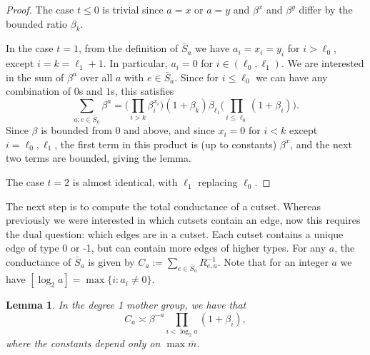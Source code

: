 \documentclass[12pt]{article}
\newtheorem{lemma}[thm]{Lemma}
\theoremstyle{definition}
\numberwithin{equation}{section}
\begin{document}
\begin{proof}
  The case $t\leq0$ is trivial since $a=x$ or $a=y$ and $\beta^x$ and
  $\beta^y$ differ by the bounded ratio $\beta_k$.

  In the case $t=1$, from the definition of $\bar S_a$ we have
  $a_i=x_i=y_i$ for $i>\ell_0$, except $i=k=\ell_1+1$.  In
  particular, $a_i=0$ for
  $i\in(\ell_0,\ell_1)$.  We are interested in the sum of $\beta^a$ over
  all $a$ with $e\in \bar S_a$.
  Since for $i\le \ell_0$ we can have any combination of $0$s and $1$s, this satisfies
  \[
  \sum_{a : e\in \bar S_a} \beta^a = \Big( \prod_{i>k} \beta_i^{x_i} \Big)
  (1+\beta_k) \beta_{\ell_1} \Big( \prod_{i\leq \ell_0} (1+\beta_i) \Big).
  \]
  Since $\beta$ is bounded from $0$ and above, and since $x_i=0$ for $i<k$  except $i=\ell_0,\ell_1$, the first term in this product is (up to constants) $\beta^x$, and the next two terms are bounded, giving the lemma.

  The case $t=2$ is almost identical, with $\ell_1$ replacing $\ell_0$.
\end{proof}


The next step is to compute the total conductance of a cutset.
Whereas previously we were interested in which cutsets contain an edge, now this requires the dual question: which edges are in a cutset.
Each cutset contains a unique edge of type 0 or -1, but can contain more edges of higher types.
For any $a$, the conductance of $\bar S_a$ is given by $C_a := \sum_{e\in \bar S_a} R_{e,a}^{-1}$.
Note that for an integer $a$ we have $[\log_2 a] = \max \{i : a_i\neq 0\}$.

\begin{lemma}\label{L:C_a_1}
  In the degree 1 mother group, we have that
  \[ C_a \asymp \beta^{-a} \prod_{i<\log_2 a} (1+\beta_i), \]
  where the constants depend only on $\max \bar m$.
\end{lemma}
\end{document}
